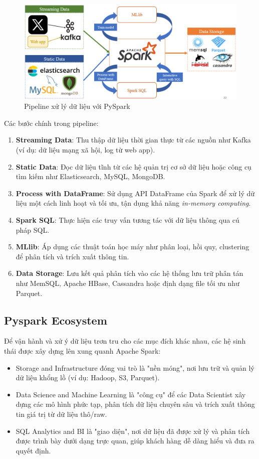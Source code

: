 \documentclass[11pt]{article}
\begin{document}
\begin{figure}[H]
    \centering
    \includegraphics[width=0.9\linewidth]{images/PySpark_pipeline.png}
    \caption{Pipeline xử lý dữ liệu với PySpark}
    \label{fig:pyspark-pipeline}
\end{figure}

\noindent Các bước chính trong pipeline:
\begin{enumerate}
    \item \textbf{Streaming Data}: Thu thập dữ liệu thời gian thực từ các nguồn như Kafka (ví dụ: dữ liệu mạng xã hội, log từ web app).
    \item \textbf{Static Data}: Đọc dữ liệu tĩnh từ các hệ quản trị cơ sở dữ liệu hoặc công cụ tìm kiếm như Elasticsearch, MySQL, MongoDB.
    \item \textbf{Process with DataFrame}: Sử dụng API DataFrame của Spark để xử lý dữ liệu một cách linh hoạt và tối ưu, tận dụng khả năng \textit{in-memory computing}.
    \item \textbf{Spark SQL}: Thực hiện các truy vấn tương tác với dữ liệu thông qua cú pháp SQL.
    \item \textbf{MLlib}: Áp dụng các thuật toán học máy như phân loại, hồi quy, clustering để phân tích và trích xuất thông tin.
    \item \textbf{Data Storage}: Lưu kết quả phân tích vào các hệ thống lưu trữ phân tán như MemSQL, Apache HBase, Cassandra hoặc định dạng file tối ưu như Parquet.
\end{enumerate}




\subsection{Pyspark Ecosystem}
Để vận hành và xử ý dữ liệu trơn tru cho các mục đích khác nhau, các hệ sinh thái được xây dựng lên xung quanh Apache Spark:
\begin{itemize}
\item Storage and Infrastructure đóng vai trò là "nền móng", nơi lưu trữ và quản lý dữ liệu khổng lồ (ví dụ: Hadoop, S3, Parquet).
\item Data Science and Machine Learning là "công cụ" để các Data Scientist xây dựng các mô hình phức tạp, phân tích dữ liệu chuyên sâu và trích xuất thông tin giá trị từ dữ liệu thô/raw.
\item SQL Analytics and BI là "giao diện", nơi dữ liệu đã được xử lý và phân tích được trình bày dưới dạng trực quan, giúp khách hàng dễ dàng hiểu và đưa ra quyết định. \\
\end{itemize}
\end{document}
